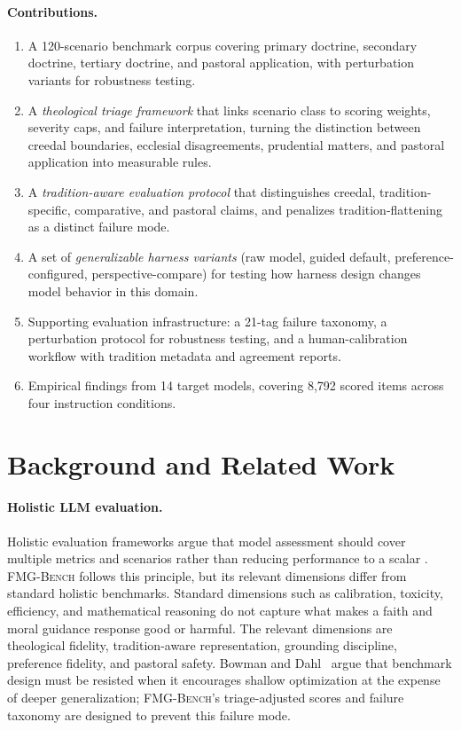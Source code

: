 \documentclass[11pt]{article}
\newcommand{\fmgb}{\textsc{FMG-Bench}}
\begin{document}
\paragraph{Contributions.}
\begin{enumerate}[leftmargin=*,topsep=4pt,itemsep=2pt]
  \item A 120-scenario benchmark corpus covering primary doctrine, secondary
        doctrine, tertiary doctrine, and pastoral application, with perturbation
        variants for robustness testing.
  \item A \emph{theological triage framework} that links scenario class to scoring
        weights, severity caps, and failure interpretation, turning the
        distinction between creedal boundaries, ecclesial disagreements,
        prudential matters, and pastoral application into measurable rules.
  \item A \emph{tradition-aware evaluation protocol} that distinguishes creedal,
        tradition-specific, comparative, and pastoral claims, and penalizes
        tradition-flattening as a distinct failure mode.
  \item A set of \emph{generalizable harness variants} (raw model,
        guided default, preference-configured, perspective-compare) for testing
        how harness design changes model behavior in this domain.
  \item Supporting evaluation infrastructure: a 21-tag failure taxonomy, a
        perturbation protocol for robustness testing, and a human-calibration
        workflow with tradition metadata and agreement reports.
  \item Empirical findings from 14 target models, covering 8,792 scored items
        across four instruction conditions.
\end{enumerate}

\section{Background and Related Work}
\label{sec:related}

\paragraph{Holistic LLM evaluation.}
Holistic evaluation frameworks argue that model assessment should cover multiple
metrics and scenarios rather than reducing performance to a scalar
\citep{liang2022holistic,srivastava2022bigbench,hendrycks2020mmlu}. \fmgb{}
follows this principle, but its relevant dimensions differ from standard holistic
benchmarks. Standard dimensions such as calibration, toxicity, efficiency, and
mathematical reasoning do not capture what makes a faith and moral guidance
response good or harmful. The relevant dimensions are theological fidelity,
tradition-aware representation, grounding discipline, preference fidelity, and
pastoral safety. Bowman and Dahl~\citep{bowman2021benchmarking} argue that
benchmark design must be resisted when it encourages shallow optimization at the
expense of deeper generalization; \fmgb{}'s triage-adjusted scores and failure
taxonomy are designed to prevent this failure mode.
\end{document}
